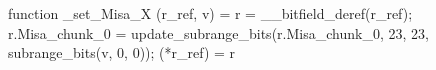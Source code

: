 function _set_Misa_X (r_ref, v) = {
    r = __bitfield_deref(r_ref);
    r.Misa_chunk_0 = update_subrange_bits(r.Misa_chunk_0, 23, 23, subrange_bits(v, 0, 0));
    (*r_ref) = r
}
